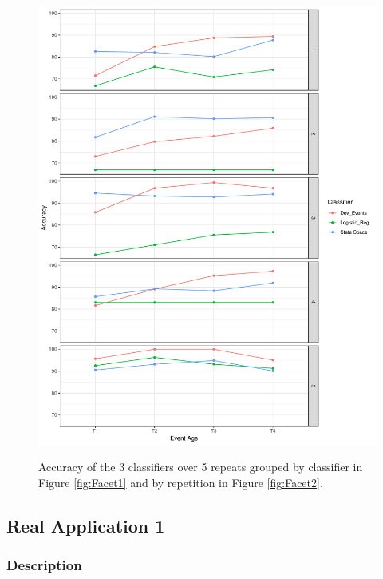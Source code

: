 \documentclass[a4paper,11pt]{article}
\begin{document}
\begin{figure}[H]
{		\includegraphics[clip=true, scale=0.25]{./Graphics/3_Classifiers_2.pdf}
		\label{fig:Facet2}
	}
	\caption{\footnotesize Accuracy of the 3 classifiers over 5 repeats grouped by classifier in Figure \ref{fig:Facet1} and by repetition in Figure \ref{fig:Facet2}. }
	\label{fig:3Classifiers}
\end{figure}


\subsection{Real Application 1}

\subsubsection{Description}
\end{document}
